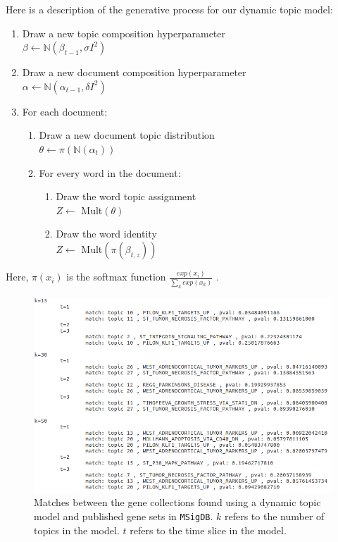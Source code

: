 \documentclass{article}
\begin{document}
Here is a description of the generative process for our dynamic topic model:
\begin{enumerate}
    \item Draw a new topic composition hyperparameter \\ $\beta \leftarrow \mathbb{N}(\beta_{t-1}, \sigma I^2)$
    \item Draw a new document composition hyperparameter \\ $\alpha \leftarrow \mathbb{N}(\alpha_{t-1}, \delta I^2)$
    \item For each document: 
    \begin{enumerate}
        \item Draw a new document topic distribution \\ $\theta \leftarrow \pi(\mathbb{N}(\alpha_t))$
        \item For every word in the document:
        \begin{enumerate}
            \item Draw the word topic assignment \\ $Z \leftarrow$ Mult$(\theta)$
            \item Draw the word identity \\ $Z \leftarrow$ Mult$(\pi(\beta_{t,z}))$
        \end{enumerate}
    \end{enumerate}
\end{enumerate}
Here, $\pi(x_i)$ is the softmax function $\frac{exp(x_i)}{\sum_k exp(x_k)}$ \cite{dtm}.

\begin{figure}
    \centering
    \includegraphics[width=1\textwidth]{figs/pathwaysdtm}
    \caption{Matches between the gene collections found using a dynamic topic model and published gene sets in \texttt{MSigDB}. $k$ refers to the number of topics in the model. $t$ refers to the time slice in the model.}
    \label{fig:pathwaysdtm}
\end{figure}
\end{document}
